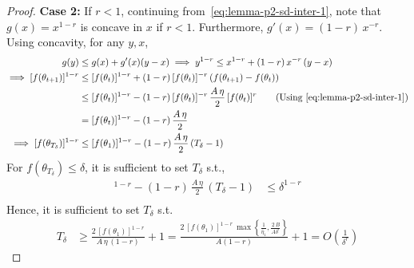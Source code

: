 \documentclass[10pt,a4paper]{amsart}
\newcommand{\tht}{\theta_t}
\newcommand{\thtt}{\theta_{t+1}}
\begin{document}
\begin{proof}
\textbf{Case 2:} If $r < 1$, continuing from~\cref{eq:lemma-p2-sd-inter-1}, note that $g(x) = x^{1-r}$ is concave in $x$ if $r < 1$. Furthermore, $g'(x) = (1-r) \, x^{-r}$. Using concavity, for any $y, x$, 
\begin{align*}
g(y) & \leq g(x) + g'(x) (y - x) \implies y^{1 - r} \leq x^{1 - r} +  (1-r) \, x^{-r} \, (y - x) \\
\implies [f(\thtt)]^{1 - r} & \leq [f(\tht)]^{1-r} + (1-r) \, [f(\tht)]^{-r} \, (f(\thtt) - f(\tht)) \\
& \leq [f(\tht)]^{1-r} - (1-r) \, [f(\tht)]^{-r} \,  \frac{A \, \eta}{2} \,  [f(\tht)]^r \tag{Using~\cref{eq:lemma-p2-sd-inter-1}} \\
& = [f(\tht)]^{1-r} - (1-r) \, \frac{A \, \eta}{2} \\
\implies [f(\theta_{T_\delta})]^{1 - r} & \leq [f(\theta_1)]^{1-r} - (1-r) \, \frac{A \, \eta}{2} \, (T_\delta -1)
\end{align*}
For $f(\theta_{T_\delta}) \leq \delta$, it is sufficient to set $T_\delta$ s.t., 
\begin{align*}
[f(\theta_1)]^{1-r} - (1-r) \, \frac{A \, \eta}{2} \, (T_\delta -1) & \leq \delta^{1-r}  \\
\end{align*}
Hence, it is sufficient to set $T_\delta$ s.t. 
\begin{align*}
T_{\delta} & \geq \frac{2 \, [f(\theta_1)]^{1-r}}{A \, \eta \, (1-r)} + 1 = \frac{2 \, [f(\theta_1)]^{1-r} \, \max\left\{\frac{1}{\bar{\eta}_1}, \frac{2 \, B}{A \delta^r}\right\}}{A (1-r)}  + 1 = O \left( \frac{1}{\delta^r} \right)
\end{align*}


\end{proof}
\end{document}
